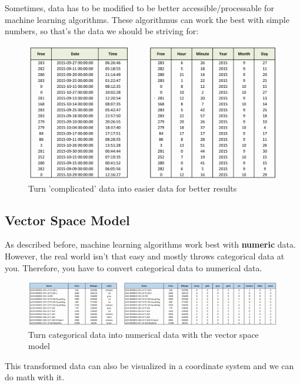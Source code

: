 \documentclass[a4paper, 11pt]{article}
\begin{document}
Sometimes, data has to be modified to be better accessible/processable for machine learning algorithms. These algorithmus can work the best with simple numbers, so that's the data we should be striving for:

\begin{figure}[htb!]
    \centering
    \includegraphics[keepaspectratio=true, width=\linewidth]{feature_engineering.png}
    \caption{Turn 'complicated' data into easier data for better results}
    \label{fig:feature_engineering}
\end{figure}

\subsection{Vector Space Model}

As described before, machine learning algorithms work best with \textbf{numeric} data. However, the real world isn't that easy and mostly throws categorical data at you. Therefore, you have to convert categorical data to numerical data. 

\begin{figure}[htb!]
    \centering
    \includegraphics[keepaspectratio=true, width=\linewidth]{vector_space_model.png}
    \caption{Turn categorical data into numerical data with the vector space model}
    \label{fig:vector_space_modefig}
\end{figure}

This transformed data can also be visualized in a coordinate system and we can do math with it.
\end{document}
